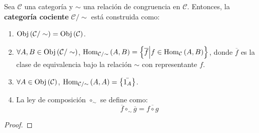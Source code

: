 \documentclass[12pt]{report}
\theoremstyle{largebreak}
\newcommand{\Obj}[1]{\ensuremath{\textup{Obj}\left(#1\right)}}
\newcommand{\Hom}[3]{\ensuremath{\textup{Hom}_{#1}\left(#2,#3\right)}}
\begin{document}
    \begin{mydef}
        Sea $\mathcal{C}$ una categoría y $\sim$ una relación de congruencia en $\mathcal{C}$. Entonces, la \textbf{categoría cociente} $\mathcal{C}/\sim$ está construida como:
        \begin{enumerate}
            \item $\Obj{\mathcal{C}/\sim}=\Obj{\mathcal{C}}$.
            \item $\forall A,B\in\Obj{\mathcal{C}/\sim}$, $\Hom{\mathcal{C}/\sim}{A}{B}=\left\{\overline{f}\Big|f\in\Hom{\mathcal{C}}{A}{B} \right\}$, donde $\overline{f}$ es la clase de equivalencia bajo la relación $\sim$ con representante $f$.
            \item $\forall A\in\Obj{\mathcal{C}}$, $\Hom{\mathcal{C}/\sim}{A}{A}=\left\{\bar{1_A} \right\}$.
            \item La ley de composición $\circ_\sim$ se define como:
            \begin{equation*}
                \overline{f}\circ_\sim\overline{g}=\overline{f\circ g}
            \end{equation*}
        \end{enumerate}
    \end{mydef}

    \begin{proof}
        
    \end{proof}
\end{document}
